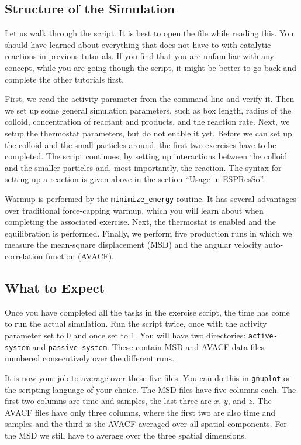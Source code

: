 \documentclass[aip,jcp,reprint,a4paper,onecolumn,nofootinbib,amsmath,amssymb]{revtex4-1}
\newcommand\code{\lstinline}
\newcommand{\es}{\mbox{\textsf{ESPResSo}}\xspace}
\newcommand\codees{\lstinline[language=espresso]}
\begin{document}
\subsection{Structure of the Simulation}

Let us walk through the script. It is best to open the file while reading this. You should have learned about everything that does not have to with catalytic reactions in previous tutorials. If you find that you are unfamiliar with any concept, while you are going though the script, it might be better to go back and complete the other tutorials first.

First, we read the activity parameter from the command line and verify it. Then we set up some general simulation parameters, such as box length, radius of the colloid, concentration of reactant and products, and the reaction rate. Next, we setup the thermostat parameters, but do not enable it yet. Before we can set up the colloid and the small particles around, the first two exercises have to be completed. The script continues, by setting up interactions between the colloid and the smaller particles and, most importantly, the reaction. The syntax for setting up a reaction is given above in the section ``Usage in \es''.

Warmup is performed by the \codees{minimize_energy} routine. It has several advantages over traditional force-capping warmup, which you will learn about when completing the associated exercise. Next, the thermostat is enabled and the equilibration is performed. Finally, we perform five production runs in which we measure the mean-square displacement (MSD) and the angular velocity auto-correlation function (AVACF).

\subsection{What to Expect}

Once you have completed all the tasks in the exercise script, the time has come to run the actual simulation. Run the script twice, once with the activity parameter set to 0 and once set to 1. You will have two directories: \code{active-system} and \code{passive-system}. These contain MSD and AVACF data files numbered consecutively over the different runs.

It is now your job to average over these five files. You can do this in \code{gnuplot} or the scripting language of your choice. The MSD files have five columns each. The first two columns are time and samples, the last three are $x$, $y$, and $z$. The AVACF files have only three columns, where the first two are also time and samples and the third is the AVACF averaged over all spatial components. For the MSD we still have to average over the three spatial dimensions.
\end{document}

